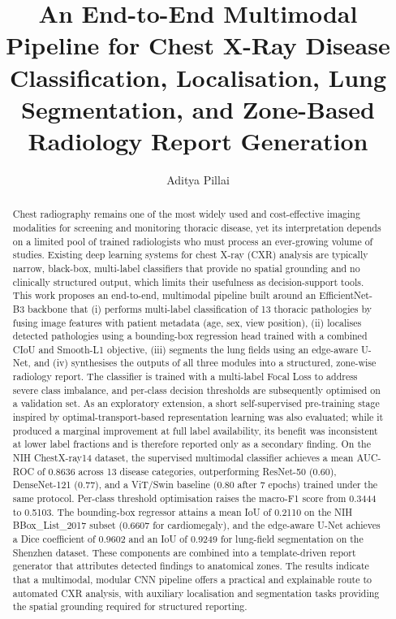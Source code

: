 \documentclass[preprint,12pt,authoryear]{elsarticle}
\begin{document}
\begin{frontmatter}

\title{An End-to-End Multimodal Pipeline for Chest X-Ray Disease Classification, Localisation, Lung Segmentation, and Zone-Based Radiology Report Generation}

\author{Aditya Pillai}

\begin{abstract}
Chest radiography remains one of the most widely used and cost-effective imaging modalities for screening and monitoring thoracic disease, yet its interpretation depends on a limited pool of trained radiologists who must process an ever-growing volume of studies. Existing deep learning systems for chest X-ray (CXR) analysis are typically narrow, black-box, multi-label classifiers that provide no spatial grounding and no clinically structured output, which limits their usefulness as decision-support tools. This work proposes an end-to-end, multimodal pipeline built around an EfficientNet-B3 backbone that (i) performs multi-label classification of 13 thoracic pathologies by fusing image features with patient metadata (age, sex, view position), (ii) localises detected pathologies using a bounding-box regression head trained with a combined CIoU and Smooth-L1 objective, (iii) segments the lung fields using an edge-aware U-Net, and (iv) synthesises the outputs of all three modules into a structured, zone-wise radiology report. The classifier is trained with a multi-label Focal Loss to address severe class imbalance, and per-class decision thresholds are subsequently optimised on a validation set. As an exploratory extension, a short self-supervised pre-training stage inspired by optimal-transport-based representation learning was also evaluated; while it produced a marginal improvement at full label availability, its benefit was inconsistent at lower label fractions and is therefore reported only as a secondary finding. On the NIH ChestX-ray14 dataset, the supervised multimodal classifier achieves a mean AUC-ROC of 0.8636 across 13 disease categories, outperforming ResNet-50 (0.60), DenseNet-121 (0.77), and a ViT/Swin baseline (0.80 after 7 epochs) trained under the same protocol. Per-class threshold optimisation raises the macro-F1 score from 0.3444 to 0.5103. The bounding-box regressor attains a mean IoU of 0.2110 on the NIH BBox\_List\_2017 subset (0.6607 for cardiomegaly), and the edge-aware U-Net achieves a Dice coefficient of 0.9602 and an IoU of 0.9249 for lung-field segmentation on the Shenzhen dataset. These components are combined into a template-driven report generator that attributes detected findings to anatomical zones. The results indicate that a multimodal, modular CNN pipeline offers a practical and explainable route to automated CXR analysis, with auxiliary localisation and segmentation tasks providing the spatial grounding required for structured reporting.
\end{abstract}


\end{frontmatter}
\end{document}
